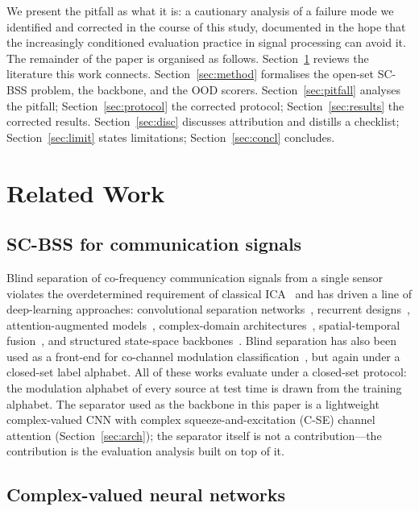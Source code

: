 \documentclass[review,12pt]{elsarticle}
\begin{document}
We present the pitfall as what it is: a cautionary analysis of a
failure mode we identified and corrected in the course of this study,
documented in the hope that the increasingly conditioned evaluation
practice in signal processing can avoid it. The remainder of the paper
is organised as follows. Section~\ref{sec:related} reviews the
literature this work connects. Section~\ref{sec:method} formalises the
open-set SC-BSS problem, the backbone, and the OOD scorers.
Section~\ref{sec:pitfall} analyses the pitfall;
Section~\ref{sec:protocol} the corrected protocol;
Section~\ref{sec:results} the corrected results.
Section~\ref{sec:disc} discusses attribution and distills a checklist;
Section~\ref{sec:limit} states limitations; Section~\ref{sec:concl}
concludes.

\section{Related Work}
\label{sec:related}

\subsection{SC-BSS for communication signals}

Blind separation of co-frequency communication signals from a single
sensor violates the overdetermined requirement of classical
ICA~\cite{hyvarinen2000ica} and has
driven a line of deep-learning approaches: convolutional separation
networks~\cite{hou2022single}, recurrent
designs~\cite{chen2019deep}, attention-augmented
models~\cite{ma2023novel}, complex-domain
architectures~\cite{guo2024single}, spatial-temporal
fusion~\cite{luo2023single}, and structured state-space
backbones~\cite{s4unet2026}.
Blind separation has also been used as a front-end for co-channel
modulation classification~\cite{deng2024co}, but again under a
closed-set label alphabet.
All of these works evaluate under a closed-set protocol: the modulation
alphabet of every source at test time is drawn from the training
alphabet. The separator used as the backbone in this paper is a
lightweight complex-valued CNN with complex squeeze-and-excitation
(C-SE) channel attention (Section~\ref{sec:arch}); the separator itself
is not a contribution---the contribution is the evaluation analysis
built on top of it.

\subsection{Complex-valued neural networks}
\end{document}
